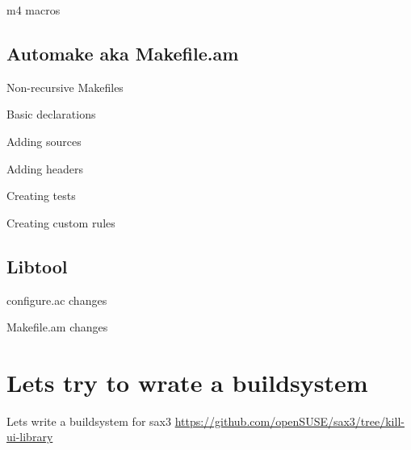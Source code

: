 \documentclass{beamer}
\begin{document}
\begin{frame}[t]{m4 macros}
	\begin{small}
	
	\end{small}
\end{frame}

\subsection{Automake aka Makefile.am}

\begin{frame}[t]{Non-recursive Makefiles}
\end{frame}

\begin{frame}[t]{Basic declarations}
\end{frame}

\begin{frame}[t]{Adding sources}
\end{frame}

\begin{frame}[t]{Adding headers}
\end{frame}

\begin{frame}[t]{Creating tests}
\end{frame}

\begin{frame}[t]{Creating custom rules}
\end{frame}

\subsection{Libtool}

\begin{frame}[t]{configure.ac changes}
\end{frame}

\begin{frame}[t]{Makefile.am changes}
\end{frame}

\section{Lets try to wrate a buildsystem}

\begin{frame}{Lets write a buildsystem for sax3}
\url{https://github.com/openSUSE/sax3/tree/kill-ui-library}
\end{frame}
\end{document}
